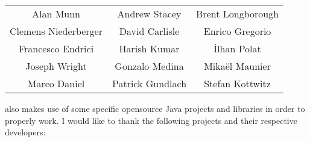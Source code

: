 \documentclass[a4paper,twoside,12pt]{memoir}
\begin{document}
\begin{mdframed}[roundcorner=10pt,linecolor=araracolor,middlelinewidth=1pt]
\centering
{\renewcommand{\arraystretch}{1.5}
\sffamily
\begin{tabular}{ccc}
Alan Munn & Andrew Stacey & Brent Longborough\\
Clemens Niederberger & David Carlisle & Enrico Gregorio\\
Francesco Endrici & Harish Kumar & \.Ilhan Polat\\
Joseph Wright & Gonzalo Medina & Mikaël Maunier\\
Marco Daniel & Patrick Gundlach & Stefan Kottwitz
\end{tabular}}
\end{mdframed}

\vspace{1em}

\noindent\arara also makes use of some specific opensource Java projects and libraries in order to properly work. I would like to thank the following projects and their respective developers:
\end{document}
